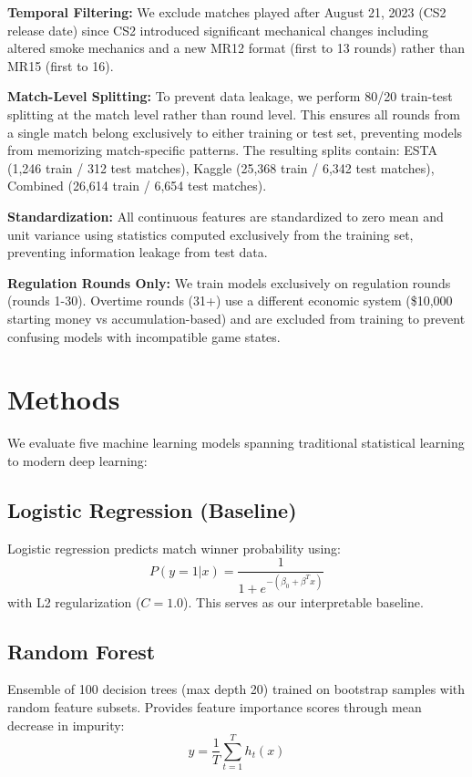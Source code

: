 \documentclass[10pt,twocolumn]{article}
\begin{document}
\textbf{Temporal Filtering:} We exclude matches played after August 21, 2023 (CS2 release date) since CS2 introduced significant mechanical changes including altered smoke mechanics and a new MR12 format (first to 13 rounds) rather than MR15 (first to 16).

\textbf{Match-Level Splitting:} To prevent data leakage, we perform 80/20 train-test splitting at the match level rather than round level. This ensures all rounds from a single match belong exclusively to either training or test set, preventing models from memorizing match-specific patterns. The resulting splits contain: ESTA (1,246 train / 312 test matches), Kaggle (25,368 train / 6,342 test matches), Combined (26,614 train / 6,654 test matches).

\textbf{Standardization:} All continuous features are standardized to zero mean and unit variance using statistics computed exclusively from the training set, preventing information leakage from test data.

\textbf{Regulation Rounds Only:} We train models exclusively on regulation rounds (rounds 1-30). Overtime rounds (31+) use a different economic system (\$10,000 starting money vs accumulation-based) and are excluded from training to prevent confusing models with incompatible game states.

\section{Methods}

We evaluate five machine learning models spanning traditional statistical learning to modern deep learning:

\subsection{Logistic Regression (Baseline)}
Logistic regression predicts match winner probability using:
\begin{equation}
P(y=1|x) = \frac{1}{1 + e^{-(\beta_0 + \beta^T x)}}
\end{equation}
with L2 regularization ($C=1.0$). This serves as our interpretable baseline.

\subsection{Random Forest}
Ensemble of 100 decision trees (max depth 20) trained on bootstrap samples with random feature subsets. Provides feature importance scores through mean decrease in impurity:
\begin{equation}
\hat{y} = \frac{1}{T}\sum_{t=1}^{T} h_t(x)
\end{equation}
\end{document}
